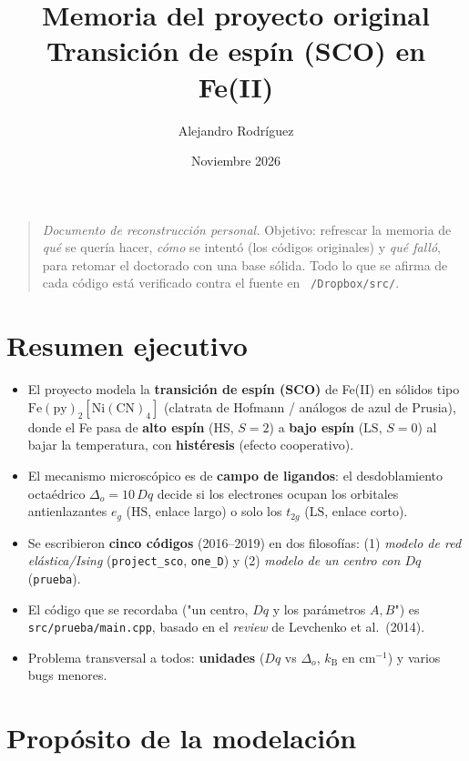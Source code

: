 \documentclass[11pt,a4paper]{article}
\title{\bfseries Memoria del proyecto original\\[2mm]\large Transición de espín (SCO) en Fe(II)}
\author{Alejandro Rodríguez}
\date{Noviembre 2026}
\newcommand{\HS}{\mathrm{HS}}
\newcommand{\LS}{\mathrm{LS}}
\newcommand{\Dq}{Dq}
\newcommand{\kb}{k_{\mathrm{B}}}
\begin{document}
\maketitle

\begin{quote}
\emph{Documento de reconstrucción personal.} Objetivo: refrescar la memoria de
\emph{qué} se quería hacer, \emph{cómo} se intentó (los códigos originales) y
\emph{qué falló}, para retomar el doctorado con una base sólida. Todo lo que se
afirma de cada código está verificado contra el fuente en \texttt{~/Dropbox/src/}.
\end{quote}

\tableofcontents

\section{Resumen ejecutivo}

\begin{itemize}
\item El proyecto modela la \textbf{transición de espín (SCO)} de Fe(II) en
  sólidos tipo $\mathrm{Fe(py)_2[Ni(CN)_4]}$ (clatrata de Hofmann / análogos de
  azul de Prusia), donde el Fe pasa de \textbf{alto espín} ($\HS$, $S=2$) a
  \textbf{bajo espín} ($\LS$, $S=0$) al bajar la temperatura, con
  \textbf{histéresis} (efecto cooperativo).
\item El mecanismo microscópico es de \textbf{campo de ligandos}: el
  desdoblamiento octaédrico $\Delta_o = 10\,\Dq$ decide si los electrones ocupan
  los orbitales antienlazantes $e_g$ ($\HS$, enlace largo) o solo los $t_{2g}$
  ($\LS$, enlace corto).
\item Se escribieron \textbf{cinco códigos} (2016--2019) en dos filosofías:
  (1) \emph{modelo de red elástica/Ising} (\texttt{project\_sco}, \texttt{one\_D})
  y (2) \emph{modelo de un centro con $\Dq$} (\texttt{prueba}).
\item El código que se recordaba ("un centro, $\Dq$ y los parámetros $A,B$") es
  \texttt{src/prueba/main.cpp}, basado en el \emph{review} de Levchenko et al.\ (2014).
\item Problema transversal a todos: \textbf{unidades} ($\Dq$ vs $\Delta_o$, $\kb$
  en cm$^{-1}$) y varios bugs menores.
\end{itemize}

\section{Propósito de la modelación}
\end{document}
